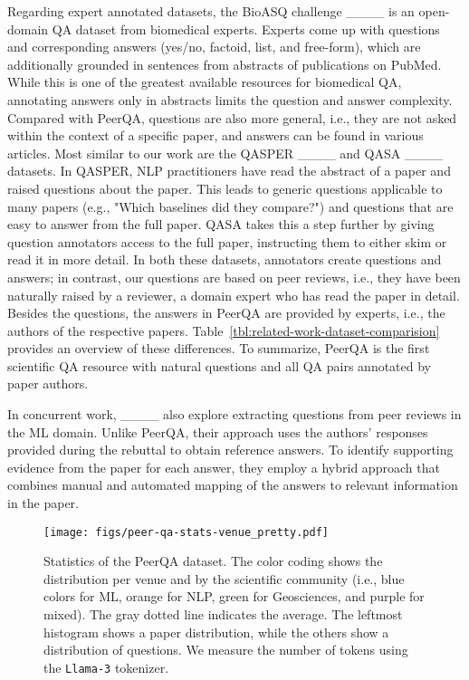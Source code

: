 Regarding expert annotated datasets, the BioASQ challenge ____ is an open-domain QA dataset from biomedical experts. Experts come up with questions and corresponding answers (yes/no, factoid, list, and free-form), which are additionally grounded in sentences from abstracts of publications on PubMed. While this is one of the greatest available resources for biomedical QA, annotating answers only in abstracts limits the question and answer complexity. Compared with PeerQA, questions are also more general, i.e., they are not asked within the context of a specific paper, and answers can be found in various articles.
Most similar to our work are the QASPER ____ and QASA ____ datasets. In QASPER, NLP practitioners have read the abstract of a paper and raised questions about the paper. This leads to generic questions applicable to many papers (e.g., "Which baselines did they compare?") and questions that are easy to answer from the full paper. QASA takes this a step further by giving question annotators access to the full paper, instructing them to either skim or read it in more detail. In both these datasets, annotators create questions and answers; in contrast, our questions are based on peer reviews, i.e., they have been naturally raised by a reviewer, a domain expert who has read the paper in detail. Besides the questions, the answers in PeerQA are provided by experts, i.e., the authors of the respective papers. Table~\ref{tbl:related-work-dataset-comparision} provides an overview of these differences. To summarize, PeerQA is the first scientific QA resource with natural questions and all QA pairs annotated by paper authors.


In concurrent work, ____ also explore extracting questions from peer reviews in the ML domain. Unlike PeerQA, their approach uses the authors' responses provided during the rebuttal to obtain reference answers. To identify supporting evidence from the paper for each answer, they employ a hybrid approach that combines manual and automated mapping of the answers to relevant information in the paper.

\begin{figure*}
    \centering
    \texttt{[image: figs/peer-qa-stats-venue\_pretty.pdf]}
    \caption{Statistics of the PeerQA dataset. The color coding shows the distribution per venue and by the scientific community (i.e., blue colors for ML, orange for NLP, green for Geosciences, and purple for mixed). The gray dotted line indicates the average. The leftmost histogram shows a paper distribution, while the others show a distribution of questions. We measure the number of tokens using the \texttt{Llama-3} tokenizer.}
    \label{fig:dataset-stats}
\end{figure*}

